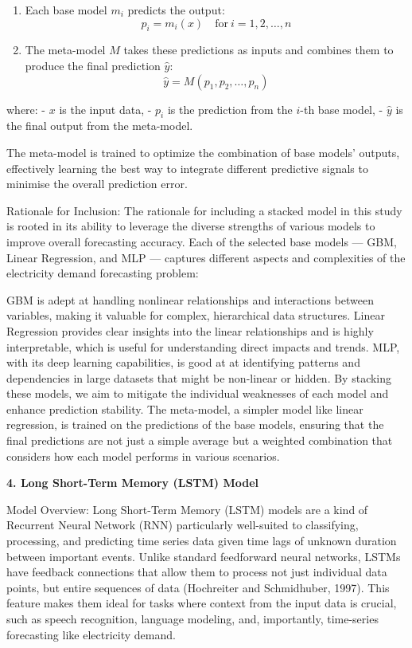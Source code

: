\documentclass[mstat,12pt]{unswthesis}
\begin{document}
\begin{enumerate}
\def\labelenumi{\arabic{enumi}.}
\item
  Each base model \(m_i\) predicts the output:
  \[ p_i = m_i(x) \quad \text{for} \ i = 1, 2, \ldots, n \]
\item
  The meta-model \(M\) takes these predictions as inputs and combines
  them to produce the final prediction \(\hat{y}\):
  \[ \hat{y} = M(p_1, p_2, \ldots, p_n) \]
\end{enumerate}

where: - \(x\) is the input data, - \(p_i\) is the prediction from the
\(i\)-th base model, - \(\hat{y}\) is the final output from the
meta-model.

The meta-model is trained to optimize the combination of base models'
outputs, effectively learning the best way to integrate different
predictive signals to minimise the overall prediction error.

Rationale for Inclusion: The rationale for including a stacked model in
this study is rooted in its ability to leverage the diverse strengths of
various models to improve overall forecasting accuracy. Each of the
selected base models --- GBM, Linear Regression, and MLP --- captures
different aspects and complexities of the electricity demand forecasting
problem:

GBM is adept at handling nonlinear relationships and interactions
between variables, making it valuable for complex, hierarchical data
structures. Linear Regression provides clear insights into the linear
relationships and is highly interpretable, which is useful for
understanding direct impacts and trends. MLP, with its deep learning
capabilities, is good at at identifying patterns and dependencies in
large datasets that might be non-linear or hidden. By stacking these
models, we aim to mitigate the individual weaknesses of each model and
enhance prediction stability. The meta-model, a simpler model like
linear regression, is trained on the predictions of the base models,
ensuring that the final predictions are not just a simple average but a
weighted combination that considers how each model performs in various
scenarios.

\textbf{4. Long Short-Term Memory (LSTM) Model}

Model Overview: Long Short-Term Memory (LSTM) models are a kind of
Recurrent Neural Network (RNN) particularly well-suited to classifying,
processing, and predicting time series data given time lags of unknown
duration between important events. Unlike standard feedforward neural
networks, LSTMs have feedback connections that allow them to process not
just individual data points, but entire sequences of data (Hochreiter
and Schmidhuber, 1997). This feature makes them ideal for tasks where
context from the input data is crucial, such as speech recognition,
language modeling, and, importantly, time-series forecasting like
electricity demand.
\end{document}
